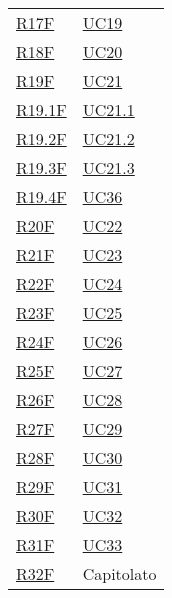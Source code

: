 \begin{center}
\begin{longtable}[!h]{p{50px} p{50px}}
        \hyperref[tab:RequisitiFunzionali]{R17F}   & \hyperref[sec:UC19]{UC19}                      \\
        \hyperref[tab:RequisitiFunzionali]{R18F}   & \hyperref[sec:UC20]{UC20}                      \\
        \hyperref[tab:RequisitiFunzionali]{R19F}   & \hyperref[sec:UC21]{UC21}                      \\
        \hyperref[tab:RequisitiFunzionali]{R19.1F} & \hyperref[sec:UC21.1]{UC21.1}                  \\
        \hyperref[tab:RequisitiFunzionali]{R19.2F} & \hyperref[sec:UC21.2]{UC21.2}                  \\
        \hyperref[tab:RequisitiFunzionali]{R19.3F} & \hyperref[sec:UC21.3]{UC21.3}                  \\
        \hyperref[tab:RequisitiFunzionali]{R19.4F} & \hyperref[sec:UC36]{UC36}                      \\
        \hyperref[tab:RequisitiFunzionali]{R20F}   & \hyperref[sec:UC22]{UC22}                      \\
        \hyperref[tab:RequisitiFunzionali]{R21F}   & \hyperref[sec:UC23]{UC23}                      \\
        \hyperref[tab:RequisitiFunzionali]{R22F}   & \hyperref[sec:UC24]{UC24}                      \\
        \hyperref[tab:RequisitiFunzionali]{R23F}   & \hyperref[sec:UC25]{UC25}                      \\
        \hyperref[tab:RequisitiFunzionali]{R24F}   & \hyperref[sec:UC26]{UC26}                      \\
        \hyperref[tab:RequisitiFunzionali]{R25F}   & \hyperref[sec:UC27]{UC27}                      \\
        \hyperref[tab:RequisitiFunzionali]{R26F}   & \hyperref[sec:UC28]{UC28}                      \\
        \hyperref[tab:RequisitiFunzionali]{R27F}   & \hyperref[sec:UC29]{UC29}                      \\
        \hyperref[tab:RequisitiFunzionali]{R28F}   & \hyperref[sec:UC30]{UC30}                      \\
        \hyperref[tab:RequisitiFunzionali]{R29F}   & \hyperref[sec:UC31]{UC31}                      \\
        \hyperref[tab:RequisitiFunzionali]{R30F}   & \hyperref[sec:UC32]{UC32}                      \\
        \hyperref[tab:RequisitiFunzionali]{R31F}   & \hyperref[sec:UC33]{UC33}                      \\
        \hyperref[tab:RequisitiFunzionali]{R32F}   & Capitolato                                     \\


\end{longtable}
\end{center}
